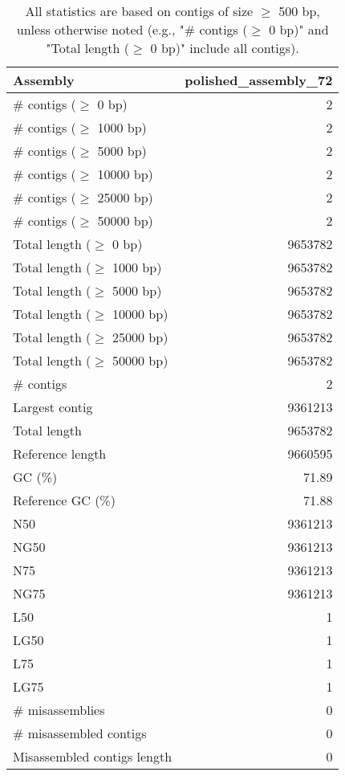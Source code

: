 \documentclass[12pt,a4paper]{article}
\begin{document}
\begin{table}[ht]
\begin{center}
\caption{All statistics are based on contigs of size $\geq$ 500 bp, unless otherwise noted (e.g., "\# contigs ($\geq$ 0 bp)" and "Total length ($\geq$ 0 bp)" include all contigs).}
\begin{tabular}{|l*{1}{|r}|}
\hline
Assembly & polished\_assembly\_72 \\ \hline
\# contigs ($\geq$ 0 bp) & 2 \\ \hline
\# contigs ($\geq$ 1000 bp) & 2 \\ \hline
\# contigs ($\geq$ 5000 bp) & 2 \\ \hline
\# contigs ($\geq$ 10000 bp) & 2 \\ \hline
\# contigs ($\geq$ 25000 bp) & 2 \\ \hline
\# contigs ($\geq$ 50000 bp) & 2 \\ \hline
Total length ($\geq$ 0 bp) & 9653782 \\ \hline
Total length ($\geq$ 1000 bp) & 9653782 \\ \hline
Total length ($\geq$ 5000 bp) & 9653782 \\ \hline
Total length ($\geq$ 10000 bp) & 9653782 \\ \hline
Total length ($\geq$ 25000 bp) & 9653782 \\ \hline
Total length ($\geq$ 50000 bp) & 9653782 \\ \hline
\# contigs & 2 \\ \hline
Largest contig & 9361213 \\ \hline
Total length & 9653782 \\ \hline
Reference length & 9660595 \\ \hline
GC (\%) & 71.89 \\ \hline
Reference GC (\%) & 71.88 \\ \hline
N50 & 9361213 \\ \hline
NG50 & 9361213 \\ \hline
N75 & 9361213 \\ \hline
NG75 & 9361213 \\ \hline
L50 & 1 \\ \hline
LG50 & 1 \\ \hline
L75 & 1 \\ \hline
LG75 & 1 \\ \hline
\# misassemblies & 0 \\ \hline
\# misassembled contigs & 0 \\ \hline
Misassembled contigs length & 0 \\ \hline

\end{tabular}
\end{center}
\end{table}
\end{document}
